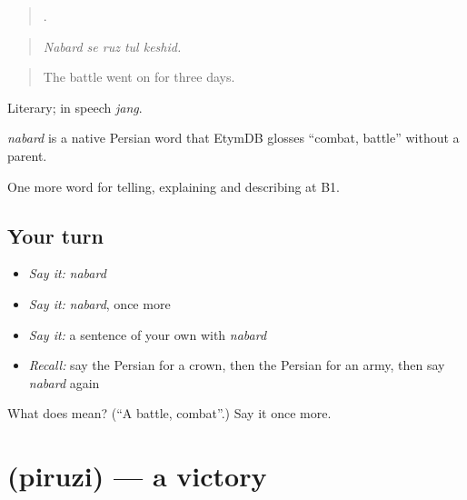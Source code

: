 \begin{quote}
    .
\end{quote}

\begin{quote}
\emph{Nabard se ruz tul keshid.}
\end{quote}

\begin{quote}
The battle went on for three days.
\end{quote}

Literary; in speech \emph{jang}.

\begin{cousinweb}
\emph{nabard} is a native Persian word that EtymDB glosses \textquotedblleft{}combat, battle\textquotedblright{} without a parent.
\end{cousinweb}

\begin{grammarlens}[title={What you've built}]
One more word for telling, explaining and describing at B1.
\end{grammarlens}

\subsection*{Your turn}
\begin{itemize}
\raggedright
  \item \emph{Say it:} \emph{nabard}
  \item \emph{Say it:} \emph{nabard}, once more
  \item \emph{Say it:} a sentence of your own with \emph{nabard}
  \item \emph{Recall:} say the Persian for a crown, then the Persian for an army, then say \emph{nabard} again
\end{itemize}

\begin{tcolorbox}[breakable,colback=teal!4,colframe=teal!35!black,title={Before you move on}]
What does  mean? (\textquotedblleft{}A battle, combat\textquotedblright{}.) Say it once more.
\end{tcolorbox}
\section[\texorpdfstring{\fa{پیروزی} (piruzi)}{پیروزی (piruzi)}]{ (piruzi) — a victory}

\label{lesson:FA-C351-piruzi}



